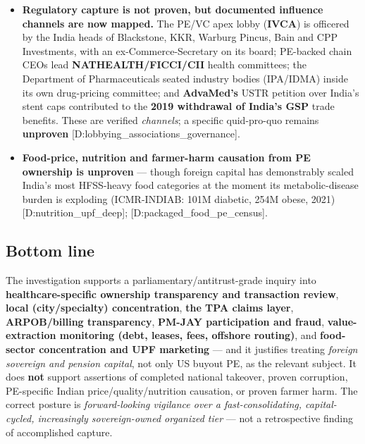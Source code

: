 \documentclass[11pt,a4paper]{article}
\newcommand{\cs}[1]{\textnormal{[#1]}}
\begin{document}
\begin{itemize}[leftmargin=1.4em,itemsep=4pt]
\item \textbf{Regulatory capture is not proven, but documented influence channels are now mapped.} The PE/VC apex lobby (\textbf{IVCA}) is officered by the India heads of Blackstone, KKR, Warburg Pincus, Bain and CPP Investments, with an ex-Commerce-Secretary on its board; PE-backed chain CEOs lead \textbf{NATHEALTH/FICCI/CII} health committees; the Department of Pharmaceuticals seated industry bodies (IPA/IDMA) inside its own drug-pricing committee; and \textbf{AdvaMed's} USTR petition over India's stent caps contributed to the \textbf{2019 withdrawal of India's GSP} trade benefits. These are verified \emph{channels}; a specific quid-pro-quo remains \textbf{unproven} \cs{D:lobbying\_associations\_governance}.

\item \textbf{Food-price, nutrition and farmer-harm causation from PE ownership is unproven} --- though foreign capital has demonstrably scaled India's most HFSS-heavy food categories at the moment its metabolic-disease burden is exploding (ICMR-INDIAB: 101M diabetic, 254M obese, 2021) \cs{D:nutrition\_upf\_deep}; \cs{D:packaged\_food\_pe\_census}.
\end{itemize}

\subsection{Bottom line}
The investigation supports a parliamentary/antitrust-grade inquiry into \textbf{healthcare-specific ownership transparency and transaction review}, \textbf{local (city/specialty) concentration}, \textbf{the TPA claims layer}, \textbf{ARPOB/billing transparency}, \textbf{PM-JAY participation and fraud}, \textbf{value-extraction monitoring (debt, leases, fees, offshore routing)}, and \textbf{food-sector concentration and UPF marketing} --- and it justifies treating \emph{foreign sovereign and pension capital}, not only US buyout PE, as the relevant subject. It does \textbf{not} support assertions of completed national takeover, proven corruption, PE-specific Indian price/quality/nutrition causation, or proven farmer harm. The correct posture is \emph{forward-looking vigilance over a fast-consolidating, capital-cycled, increasingly sovereign-owned organized tier} --- not a retrospective finding of accomplished capture.
\end{document}

